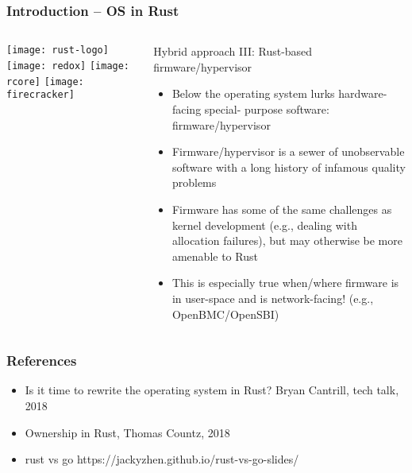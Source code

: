 \begin{frame}[plain]
	\frametitle{Introduction -- OS in Rust}
	
	
	
	\begin{columns}
		
		\begin{column}{.2\textwidth}
			
			\texttt{[image: rust-logo]}
			\texttt{[image: redox]}
			\texttt{[image: rcore]}
			\texttt{[image: firecracker]}
		\end{column}
		
		\begin{column}{.8\textwidth}
			
			Hybrid approach III: Rust-based firmware/hypervisor

			\begin{itemize}
				
				\item  Below the operating system lurks hardware-facing special-
				purpose software: firmware/hypervisor
				
				
				\item Firmware/hypervisor is a sewer of unobservable software with a long
				history of infamous quality problems
				
				
				\item  Firmware has some of the same challenges as kernel
				development (e.g., dealing with allocation failures), but may
				otherwise be more amenable to Rust

				\item This is especially true when/where firmware is in user-space
				and is network-facing! (e.g., OpenBMC/OpenSBI)
				
			\end{itemize}
			
		\end{column}
		
		
	\end{columns}
	
	
\end{frame}

\begin{frame}[plain]
	\frametitle{References}
	
	\begin{itemize}
		
		\item Is it time to rewrite the operating system in Rust? Bryan Cantrill, tech talk, 2018
		\item Ownership in Rust, Thomas Countz, 2018
		
		\item rust vs go https://jackyzhen.github.io/rust-vs-go-slides/
		
	\end{itemize}
	
	
\end{frame}

